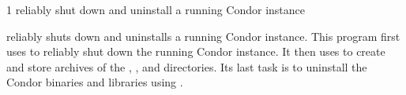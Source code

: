 \begin{ManPage}{\label{man-condor-cold-stop}}{1}
{reliably shut down and uninstall a running Condor instance}

\Synopsis {}



\Description 
{} reliably shuts down and uninstalls a
running Condor instance.  
This program first uses  to
reliably shut down the running Condor instance.
It then uses  to create and store archives of the
, , and  directories.
Its last task is to 
uninstall the Condor binaries and libraries using .


\end{ManPage}
